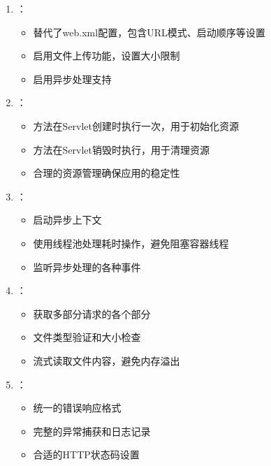 \begin{enumerate}
\def\labelenumi{\arabic{enumi}.}
\tightlist
\item
  ：

  \begin{itemize}
  \tightlist
  \item
    替代了web.xml配置，包含URL模式、启动顺序等设置
  \item
    启用文件上传功能，设置大小限制
  \item
    启用异步处理支持
  \end{itemize}
\item
  ：

  \begin{itemize}
  \tightlist
  \item
    方法在Servlet创建时执行一次，用于初始化资源
  \item
    方法在Servlet销毁时执行，用于清理资源
  \item
    合理的资源管理确保应用的稳定性
  \end{itemize}
\item
  ：

  \begin{itemize}
  \tightlist
  \item
    启动异步上下文
  \item
    使用线程池处理耗时操作，避免阻塞容器线程
  \item
    监听异步处理的各种事件
  \end{itemize}
\item
  ：

  \begin{itemize}
  \tightlist
  \item
    获取多部分请求的各个部分
  \item
    文件类型验证和大小检查
  \item
    流式读取文件内容，避免内存溢出
  \end{itemize}
\item
  ：

  \begin{itemize}
  \tightlist
  \item
    统一的错误响应格式
  \item
    完整的异常捕获和日志记录
  \item
    合适的HTTP状态码设置
  \end{itemize}
\end{enumerate}


